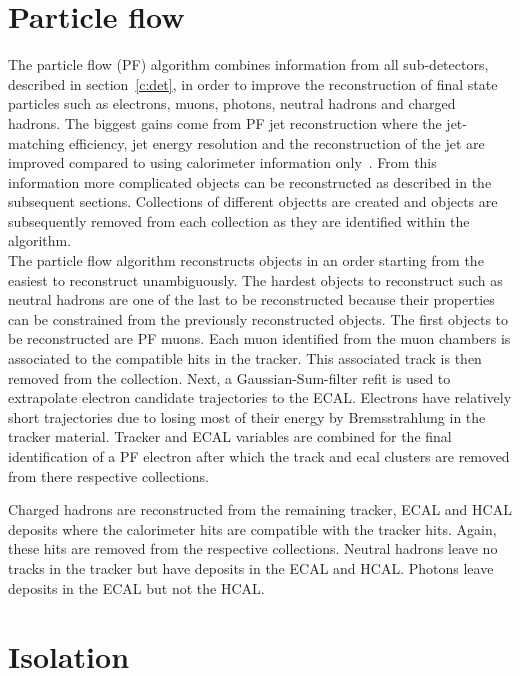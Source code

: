 \section{Particle flow ~\label{sec:PF}}

The particle flow (PF) algorithm combines information from all sub-detectors, described in section~\ref{c:det}, in order to improve the reconstruction of final state particles such as electrons, muons, photons, neutral hadrons and charged hadrons. The biggest gains come from PF jet reconstruction where the jet-matching efficiency, jet energy resolution and the reconstruction of the jet \pt are improved compared to using calorimeter information only~\cite{CMS-PAS-PFT-10-001}. From this information more complicated objects can be reconstructed as described in the subsequent sections. Collections of different objectts are created and objects are subsequently removed from each collection as they are identified within the algorithm.\\

The particle flow algorithm reconstructs objects in an order starting from the easiest to reconstruct unambiguously. The hardest objects to reconstruct such as neutral hadrons are one of the last to be reconstructed because their properties can be constrained from the previously reconstructed objects.
The first objects to be reconstructed are PF muons. Each muon identified from the muon chambers is associated to the compatible hits in the tracker. This associated track is then removed from the collection. Next, a Gaussian-Sum-filter refit is used to extrapolate electron candidate trajectories to the ECAL. Electrons have relatively short trajectories due to losing most of their energy by Bremsstrahlung in the tracker material. Tracker and ECAL variables are combined for the final identification of a PF electron after which the track and ecal clusters are removed from there respective collections.

Charged hadrons are reconstructed from the remaining tracker, ECAL and HCAL deposits where the calorimeter hits are compatible with the tracker hits. Again, these hits are removed from the respective collections. Neutral hadrons leave no tracks in the tracker but have deposits in the ECAL and HCAL. Photons leave deposits in the ECAL but not the HCAL.

\section{Isolation \label{sec:isolation}}

